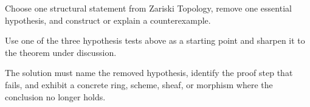 \begin{exercise}\label{exr:vi02-expand-16}
Choose one structural statement from Zariski Topology, remove one essential hypothesis, and construct or explain a counterexample.
\end{exercise}
\begin{hint}
Use one of the three hypothesis tests above as a starting point and sharpen it to the theorem under discussion.
\end{hint}
\begin{solution}
The solution must name the removed hypothesis, identify the proof step that fails, and exhibit a concrete ring, scheme, sheaf, or morphism where the conclusion no longer holds.
\end{solution}

